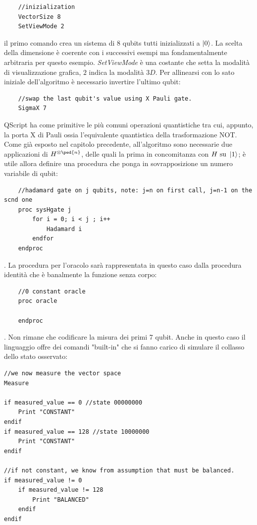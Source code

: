\documentclass[12pt,a4paper,openright]{report}
\begin{document}
\begin{lstlisting}
    //inizialization
    VectorSize 8
    SetViewMode 2
\end{lstlisting}

il primo comando crea un sistema di 8 qubits tutti inizializzati a $\ket0$. La scelta della dimensione è coerente con i successivi esempi ma fondamentalmente arbitraria per questo esempio.
\textit{SetViewMode} è una costante che setta la modalità di visualizzazione grafica, $2$ indica la modalità $3D$.
Per allinearsi con lo sato iniziale dell'algoritmo è necessario invertire l'ultimo qubit:

\begin{lstlisting}
    //swap the last qubit's value using X Pauli gate.
    SigmaX 7
\end{lstlisting}

QScript ha come primitive le più comuni operazioni quantistiche tra cui, appunto, la porta X di Pauli ossia l'equivalente quantistica della trasformazione NOT.
Come già esposto nel capitolo precedente, all'algoritmo sono necessarie due applicazioni di $H^{\otimes\ped{n}}$, delle quali la prima in concomitanza con $H \text{ su } \ket{1}$;
è utile allora definire una procedura che ponga in sovrapposizione un numero variabile di qubit:

\begin{lstlisting}
    //hadamard gate on j qubits, note: j=n on first call, j=n-1 on the scnd one
    proc sysHgate j
        for i = 0; i < j ; i++
            Hadamard i
        endfor
    endproc
\end{lstlisting}

\newpage
.  La procedura per l'oracolo sarà rappresentata in questo caso dalla procedura identità che è banalmente la funzione senza corpo:

\begin{lstlisting}
    //0 constant oracle
    proc oracle

    endproc
\end{lstlisting}

. Non rimane che codificare la misura dei primi 7 qubit. Anche in questo caso il linguaggio offre dei comandi "built-in" che si fanno carico di simulare il collasso dello stato osservato:

\begin{lstlisting}
//we now measure the vector space
Measure

if measured_value == 0 //state 00000000 
	Print "CONSTANT"
endif
if measured_value == 128 //state 10000000
	Print "CONSTANT"
endif

//if not constant, we know from assumption that must be balanced.
if measured_value != 0
	if measured_value != 128
		Print "BALANCED"
	endif
endif
\end{lstlisting}
\end{document}
